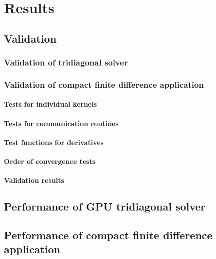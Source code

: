 \chapter{Results}

\section{Validation}
    \subsection{Validation of tridiagonal solver}
    \subsection{Validation of compact finite difference application}
        \subsubsection{Tests for individual kernels}
        \subsubsection{Tests for communication routines}
        \subsubsection{Test functions for derivatives}
        \subsubsection{Order of convergence tests}
    \subsubsection{Validation results}

\section{Performance of GPU tridiagonal solver}
\section{Performance of compact finite difference application}
